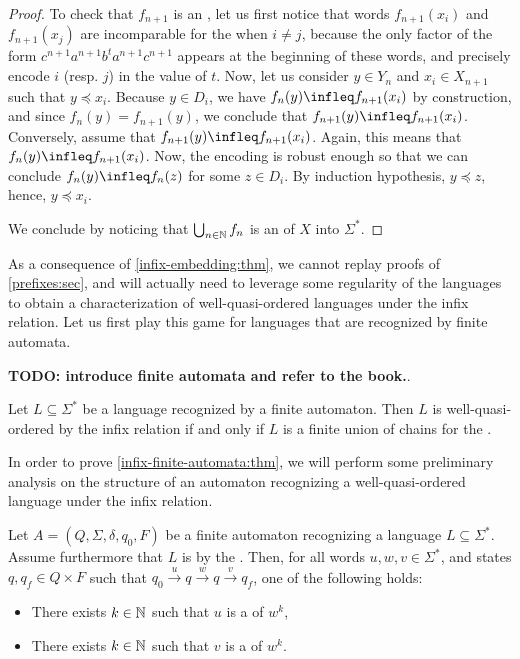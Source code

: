 \begin{proof}
    To check that $f_{n+1}$ is an , let us first notice that
    words $f_{n+1}(x_i)$ and $f_{n+1}(x_j)$ are incomparable for the  when $i \neq j$, because the only factor of the form $c^{n+1}
    a^{n+1} b^t a^{n+1} c^{n+1}$ appears at the beginning of these words, and
    precisely encode $i$ (resp. $j$) in the value of $t$. Now, let us consider
    $y \in Y_n$ and $x_i \in X_{n+1}$ such that $y \preceq x_i$. Because $y \in
    D_i$, we have $f_n(y) \infleq f_{n+1}(x_i)$ by construction, and since
    $f_n(y) = f_{n+1}(y)$, we conclude that $f_{n+1}(y) \infleq f_{n+1}(x_i)$. 
    Conversely, assume that
    $f_{n+1}(y) \infleq f_{n+1}(x_i)$. Again, this means
    that $f_n(y) \infleq f_{n+1}(x_i)$. Now, the encoding
    is robust enough so that we can conclude
    $f_{n}(y) \infleq f_{n}(z)$ for some $z \in D_i$.
    By induction hypothesis, $y \preceq z$, hence, $y \preceq x_i$.

    We conclude by noticing that $\bigcup_{n \in \mathbb{N}} f_n$ is an 
    of $X$ into $\Sigma^*$.
\end{proof}

As a consequence of \cref{infix-embedding:thm}, we cannot replay proofs of
\cref{prefixes:sec}, and will actually need to leverage some
regularity of the languages to obtain a characterization of well-quasi-ordered
languages under the infix relation. Let us first play this game for languages
that are recognized by finite automata.

\textbf{TODO: introduce finite automata and refer to the book.}.


\begin{theorem}
    \label{infix-finite-automata:thm}
    Let $L \subseteq \Sigma^*$ be a language recognized by a finite automaton.
    Then $L$ is well-quasi-ordered by the infix relation if and only if $L$ is
    a finite union of chains for the .
\end{theorem}

In order to prove \cref{infix-finite-automata:thm}, we will perform
some preliminary analysis on the structure of an automaton recognizing a
well-quasi-ordered language under the infix relation.

\begin{lemma}
    Let $A = (Q, \Sigma, \delta, q_0, F)$ be a finite automaton recognizing a
    language $L \subseteq \Sigma^*$. Assume furthermore that
    $L$ is  by the .
    Then, for all words $u,w,v \in \Sigma^*$, and states
    $q, q_f \in Q \times F$ such that
    $q_0 \xrightarrow{u} q \xrightarrow{w} q \xrightarrow{v} q_f$,
    one of the following holds:
    \begin{itemize}
        \item There exists $k \in \mathbb{N}$
            such that $u$ is a  of $w^k$,
        \item There exists $k \in \mathbb{N}$
            such that $v$ is a  of $w^k$.
    \end{itemize}
\end{lemma}

